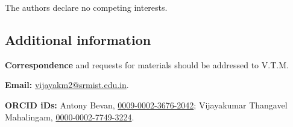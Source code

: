 The authors declare no competing interests.

\subsection*{Additional information}

\noindent\textbf{Correspondence} and requests for materials should be addressed to V.T.M.

\noindent\textbf{Email:} \href{mailto:vijayakm2@srmist.edu.in}{vijayakm2@srmist.edu.in}.

\noindent\textbf{ORCID iDs:} Antony Bevan, \href{https://orcid.org/0009-0002-3676-2042}{0009-0002-3676-2042}; Vijayakumar Thangavel Mahalingam, \href{https://orcid.org/0000-0002-7749-3224}{0000-0002-7749-3224}.
